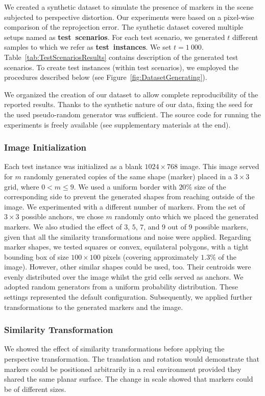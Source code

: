We created a synthetic dataset to simulate the presence of markers in the scene subjected to perspective distortion. Our experiments were based on a pixel-wise comparison of the reprojection error. The synthetic dataset covered multiple setups named as \mbox{\textbf{test scenarios}}. For each test scenario, we generated $t$ different samples to which we refer as \mbox{\textbf{test instances}}. We set $t = 1\ 000$. Table~\ref{tab:TestScenariosResults} contains description of the generated test scenarios. To create test instances (within test scenarios), we employed the procedures described below (see Figure~\ref{fig:DatasetGenerating}).

We organized the creation of our dataset to allow complete reproducibility of the reported results. Thanks to the synthetic nature of our data, fixing the seed for the used pseudo-random generator was sufficient. The source code for running the experiments is freely available (see supplementary materials at the end).

\subsubsection{Image Initialization}
Each test instance was initialized as a blank $1024 \times 768$ image. This image served for $m$ randomly generated copies of the same shape (marker) placed in a $3 \times 3$ grid, where $0 < m \leq 9$. We used a uniform border with $20$\% size of the corresponding side to prevent the generated shapes from reaching outside of the image. We experimented with a different number of markers. From the set of $3 \times 3$ possible anchors, we chose $m$ randomly onto which we placed the generated markers. We also studied the effect of $3$, $5$, $7$, and $9$ out of $9$ possible markers, given that all the similarity transformations and noise were applied. Regarding marker shapes, we tested squares or convex, equilateral polygons, with a tight bounding box of size $100 \times 100$ pixels (covering approximately $1.3$\% of the image). However, other similar shapes could be used, too. Their centroids were evenly distributed over the image whilst the grid cells served as anchors. We adopted random generators from a uniform probability distribution. These settings represented the default configuration. Subsequently, we applied further transformations to the generated markers and the image.

\subsubsection{Similarity Transformation}
We showed the effect of similarity transformations before applying the perspective transformation. The translation and rotation would demonstrate that markers could be positioned arbitrarily in a real environment provided they shared the same planar surface. The change in scale showed that markers could be of different sizes.

